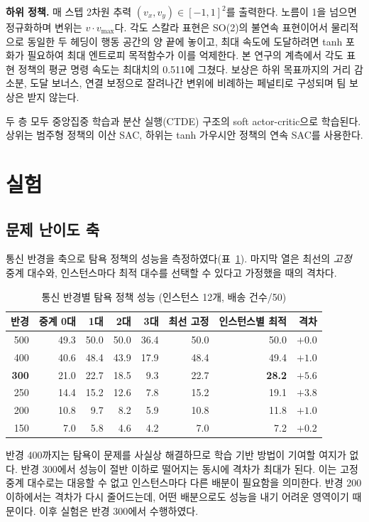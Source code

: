 \documentclass[12pt]{article}
\begin{document}
\textbf{하위 정책.} 매 스텝 2차원 추력 $(v_x, v_y) \in [-1,1]^2$를 출력한다. 노름이 1을 넘으면
정규화하며 변위는 $v \cdot v_{\max}$다. 각도 스칼라 표현은 SO(2)의 불연속 표현이어서 물리적으로
동일한 두 헤딩이 행동 공간의 양 끝에 놓이고, 최대 속도에 도달하려면 tanh 포화가 필요하여
최대 엔트로피 목적함수가 이를 억제한다. 본 연구의 계측에서 각도 표현 정책의 평균 명령 속도는
최대치의 0.511에 그쳤다. 보상은 하위 목표까지의 거리 감소분, 도달 보너스, 연결 보정으로
잘려나간 변위에 비례하는 페널티로 구성되며 팀 보상은 받지 않는다.

두 층 모두 중앙집중 학습과 분산 실행(CTDE) 구조의 soft actor-critic으로 학습된다. 상위는
범주형 정책의 이산 SAC, 하위는 tanh 가우시안 정책의 연속 SAC를 사용한다.

\section{실험}

\subsection{문제 난이도 축}

통신 반경을 축으로 탐욕 정책의 성능을 측정하였다(표~\ref{tab:sweep}). 마지막 열은 최선의
\emph{고정} 중계 대수와, 인스턴스마다 최적 대수를 선택할 수 있다고 가정했을 때의 격차다.

\begin{table}[h]
\centering
\caption{통신 반경별 탐욕 정책 성능 (인스턴스 12개, 배송 건수/50)}
\label{tab:sweep}
\begin{tabular}{rrrrrrrr}
\toprule
반경 & 중계 0대 & 1대 & 2대 & 3대 & 최선 고정 & 인스턴스별 최적 & 격차 \\
\midrule
500 & 49.3 & 50.0 & 50.0 & 36.4 & 50.0 & 50.0 & $+0.0$ \\
400 & 40.6 & 48.4 & 43.9 & 17.9 & 48.4 & 49.4 & $+1.0$ \\
\textbf{300} & 21.0 & 22.7 & 18.5 & 9.3 & 22.7 & \textbf{28.2} & $\mathbf{+5.6}$ \\
250 & 14.4 & 15.2 & 12.6 & 7.8 & 15.2 & 19.1 & $+3.8$ \\
200 & 10.8 & 9.7 & 8.2 & 5.9 & 10.8 & 11.8 & $+1.0$ \\
150 & 7.0 & 5.8 & 4.6 & 4.2 & 7.0 & 7.2 & $+0.2$ \\
\bottomrule
\end{tabular}
\end{table}

반경 400까지는 탐욕이 문제를 사실상 해결하므로 학습 기반 방법이 기여할 여지가 없다. 반경
300에서 성능이 절반 이하로 떨어지는 동시에 격차가 최대가 된다. 이는 고정 중계 대수로는 대응할
수 없고 인스턴스마다 다른 배분이 필요함을 의미한다. 반경 200 이하에서는 격차가 다시 줄어드는데,
어떤 배분으로도 성능을 내기 어려운 영역이기 때문이다. 이후 실험은 반경 300에서 수행하였다.
\end{document}
